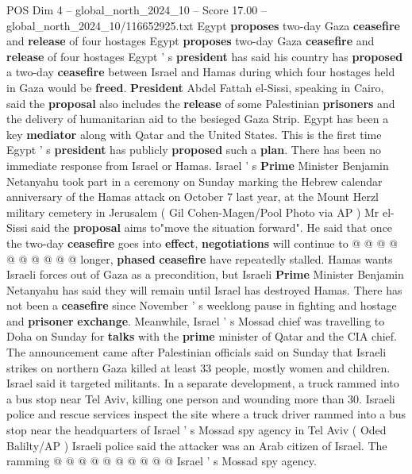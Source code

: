 \begin{textsample}{POS Dim 4 – global\_north\_2024\_10 – Score 17.00 – global\_north\_2024\_10/116652925.txt}  \label{ex:f4_pos_409}
Egypt \textbf{proposes} two-day Gaza \textbf{ceasefire} and \textbf{release} of four hostages Egypt \textbf{proposes} two-day Gaza \textbf{ceasefire} and \textbf{release} of four hostages Egypt ' s \textbf{president} has said his country has \textbf{proposed} a two-day \textbf{ceasefire} between Israel and Hamas during which four hostages held in Gaza would be \textbf{freed}. \textbf{President} Abdel Fattah el-Sissi, speaking in Cairo, said the \textbf{proposal} also includes the \textbf{release} of some Palestinian \textbf{prisoners} and the delivery of humanitarian aid to the besieged Gaza Strip.
Egypt has been a key \textbf{mediator} along with Qatar and the United States.
This is the first time Egypt ' s \textbf{president} has publicly \textbf{proposed} such a \textbf{plan}.
There has been no immediate response from Israel or Hamas.
Israel ' s \textbf{Prime} Minister Benjamin Netanyahu took part in a ceremony on Sunday marking the Hebrew calendar anniversary of the Hamas attack on October 7 last year, at the Mount Herzl military cemetery in Jerusalem ( Gil Cohen-Magen/Pool Photo via AP ) Mr el-Sissi said the \textbf{proposal} aims to"move the situation forward".
He said that once the two-day \textbf{ceasefire} goes into \textbf{effect}, \textbf{negotiations} will continue to @ @ @ @ @ @ @ @ @ @ longer, \textbf{phased} \textbf{ceasefire} have repeatedly stalled.
Hamas wants Israeli forces out of Gaza as a precondition, but Israeli \textbf{Prime} Minister Benjamin Netanyahu has said they will remain until Israel has destroyed Hamas.
There has not been a \textbf{ceasefire} since November ' s weeklong pause in fighting and hostage and \textbf{prisoner} \textbf{exchange}.
Meanwhile, Israel ' s Mossad chief was travelling to Doha on Sunday for \textbf{talks} with the \textbf{prime} minister of Qatar and the CIA chief.
The announcement came after Palestinian officials said on Sunday that Israeli strikes on northern Gaza killed at least 33 people, mostly women and children.
Israel said it targeted militants.
In a separate development, a truck rammed into a bus stop near Tel Aviv, killing one person and wounding more than 30.
Israeli police and rescue services inspect the site where a truck driver rammed into a bus stop near the headquarters of Israel ' s Mossad spy agency in Tel Aviv ( Oded Balilty/AP ) Israeli police said the attacker was an Arab citizen of Israel.
The ramming @ @ @ @ @ @ @ @ @ @ Israel ' s Mossad spy agency.

\end{textsample}

